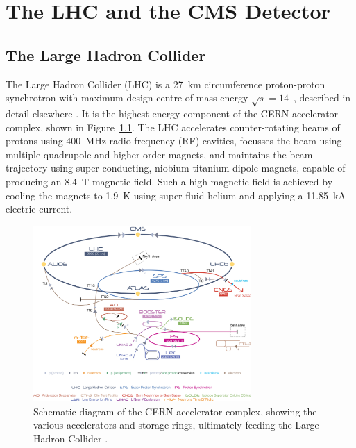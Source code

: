 \chapter{The LHC and the CMS Detector}
\label{ch:detector}

\ifpdf
    \graphicspath{{Chapter3/Figs/Raster/}{Chapter3/Figs/PDF/}{Chapter3/Figs/}}
\else
    \graphicspath{{Chapter3/Figs/Vector/}{Chapter3/Figs/}}
\fi


\section{The Large Hadron Collider}  %
\label{sec:detector_lhc}

The Large Hadron Collider (LHC) is a 27~km circumference proton-proton 
synchrotron with maximum design centre of mass energy
$\sqrt{s} = 14$~\tev, described in detail elsewhere \cite{Evans:2008zzb}. It
is the highest energy component of the CERN accelerator
complex, shown in Figure~\ref{fig:cern_acc_complex}. The LHC
accelerates counter-rotating beams of protons using 400~MHz radio frequency
(RF) cavities, focusses the beam using multiple quadrupole and higher order magnets,
and maintains the beam trajectory using super-conducting, niobium-titanium 
dipole magnets, capable of producing an 8.4~T magnetic field. Such a high 
magnetic field is achieved by cooling the magnets to 1.9~K using super-fluid 
helium and applying a 11.85~kA electric current.


\begin{figure}[ht!]
\centering
\includegraphics[width=0.74\textwidth]{Figs/machine/Cern-Accelerator-Complex.jpg}
\caption{Schematic diagram of the CERN accelerator complex, showing the various
accelerators and storage rings, ultimately feeding the Large Hadron Collider
\cite{acc_complex}.}
\label{fig:cern_acc_complex}
\end{figure}

